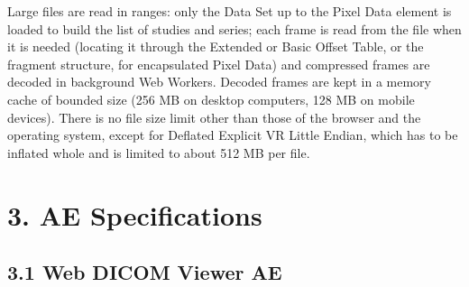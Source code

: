 \documentclass[11pt]{article}
\begin{document}
Large files are read in ranges: only the Data Set up to the Pixel Data element is loaded to build the list of studies and series; each frame is read from the file when it is needed (locating it through the Extended or Basic Offset Table, or the fragment structure, for encapsulated Pixel Data) and compressed frames are decoded in background Web Workers. Decoded frames are kept in a memory cache of bounded size (256 MB on desktop computers, 128 MB on mobile devices). There is no file size limit other than those of the browser and the operating system, except for Deflated Explicit VR Little Endian, which has to be inflated whole and is limited to about 512 MB per file.

\section*{3. AE Specifications}

\subsection*{3.1 Web DICOM Viewer AE}
\end{document}
